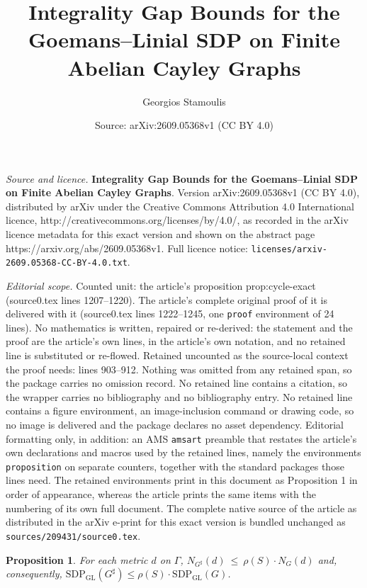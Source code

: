 \documentclass[10pt,a4paper]{amsart}
\title{\textbf{Integrality Gap Bounds for the Goemans–Linial SDP on Finite Abelian Cayley Graphs}}
\author{Georgios Stamoulis}
\date{Source: arXiv:2609.05368v1 (CC BY 4.0)}
\newtheorem{proposition}{Proposition}
\newcommand{\gl}{\operatorname{SDP_{GL}}}
\begin{document}
\maketitle

\noindent\emph{Source and licence.} \textbf{Integrality Gap Bounds for the Goemans–Linial SDP on Finite Abelian Cayley Graphs}. Version arXiv:2609.05368v1 (CC BY 4.0), distributed by arXiv under the Creative Commons Attribution 4.0 International licence, http://creativecommons.org/licenses/by/4.0/, as recorded in the arXiv licence metadata for this exact version and shown on the abstract page https://arxiv.org/abs/2609.05368v1. Full licence notice: \texttt{licenses/arxiv-2609.05368-CC-BY-4.0.txt}.\par\smallskip

\noindent\textit{Editorial scope.} Counted unit: the article's proposition prop:cycle-exact (source0.tex lines 1207--1220). The article's complete original proof of it is delivered with it (source0.tex lines 1222--1245, one \texttt{proof} environment of 24 lines). No mathematics is written, repaired or re-derived: the statement and the proof are the article's own lines, in the article's own notation, and no retained line is substituted or re-flowed.  Retained uncounted as the source-local context the proof needs: lines 903--912.  Nothing was omitted from any retained span, so the package carries no omission record.  No retained line contains a citation, so the wrapper carries no bibliography and no bibliography entry.  No retained line contains a figure environment, an image-inclusion command or drawing code, so no image is delivered and the package declares no asset dependency.  Editorial formatting only, in addition: an AMS \texttt{amsart} preamble that restates the article's own declarations and macros used by the retained lines, namely the environments \texttt{proposition} on separate counters, together with the standard packages those lines need.  The retained environments print in this document as Proposition 1 in order of appearance, whereas the article prints the same items with the numbering of its own full document.  The complete native source of the article as distributed in the arXiv e-print for this exact version is bundled unchanged as \texttt{sources/209431/source0.tex}.
\begin{proposition}\label{prop:metric-averaging}
For each metric $d$ on $\Gamma$,  $N_{G^\sharp}(d)  ~\leq~ \rho(S) \cdot N_G(d)$
and, consequently, $\gl(G^\sharp) \leq \rho(S) \cdot \gl(G)$.
\end{proposition}
\end{document}
